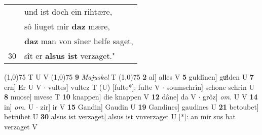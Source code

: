 \documentclass[8pt,a4paper,notitlepage]{article}
\begin{document}
\begin{table}[ht]
\begin{minipage}[t]{0.5\linewidth}
\begin{tabular}{rl}
 & und ist doch ein rihtære,\\ 
 & sô liuget mir \textbf{daz} mære,\\ 
 & \textbf{daz} man von sîner helfe saget,\\ 
30 & sît er \textbf{alsus ist} verzaget."\\ 
\end{tabular}
\scriptsize
\line(1,0){75} \newline
T U V \newline
\line(1,0){75} \newline
\textbf{9} \textit{Majuskel} T  \newline
\line(1,0){75} \newline
\textbf{2} al] alles V \textbf{5} guldînen] guͦlden U \textbf{7} ern] Er U V  $\cdot$ vultes] vultez T (U) [fulte*]: fulte  V  $\cdot$ soumschrîn] schone schrin U \textbf{8} muose] mvese T \textbf{10} knappen] die knappen V \textbf{12} dâne] da V  $\cdot$ grôz] \textit{om.} U V \textbf{14} in] \textit{om.} U  $\cdot$ zir] ir V \textbf{15} Gandin] Gaudin U \textbf{19} Gandines] gaudines U \textbf{21} betoubet] betruͦbet U \textbf{30} alsus ist verzaget] alsus ist vnverzaget U [*]: an mir sus hat verzaget V \newline
\end{minipage}
\end{table}
\end{document}
